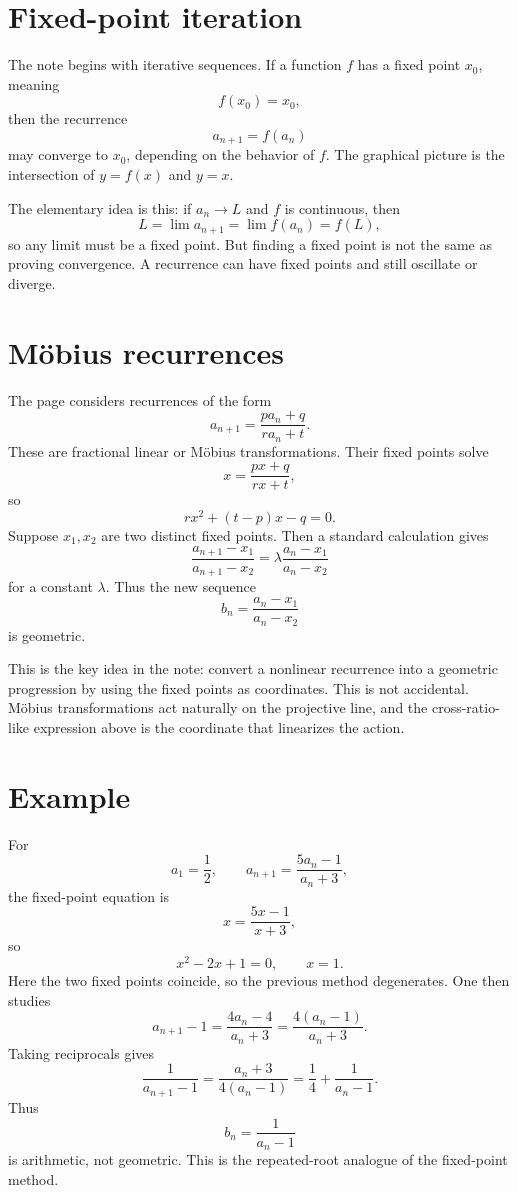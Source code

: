 
\section{Fixed-point iteration}

The note begins with iterative sequences.  If a function \(f\) has a fixed point \(x_0\), meaning
\[
  f(x_0)=x_0,
\]
then the recurrence
\[
  a_{n+1}=f(a_n)
\]
may converge to \(x_0\), depending on the behavior of \(f\).  The graphical picture is the intersection of \(y=f(x)\) and \(y=x\).

The elementary idea is this: if \(a_n\to L\) and \(f\) is continuous, then
\[
  L=\lim a_{n+1}=\lim f(a_n)=f(L),
\]
so any limit must be a fixed point.  But finding a fixed point is not the same as proving convergence.  A recurrence can have fixed points and still oscillate or diverge.

\section{Möbius recurrences}

The page considers recurrences of the form
\[
  a_{n+1}=\frac{pa_n+q}{ra_n+t}.
\]
These are fractional linear or Möbius transformations.  Their fixed points solve
\[
  x=\frac{px+q}{rx+t},
\]
so
\[
  rx^2+(t-p)x-q=0.
\]
Suppose \(x_1,x_2\) are two distinct fixed points.  Then a standard calculation gives
\[
  \frac{a_{n+1}-x_1}{a_{n+1}-x_2}
  =
  \lambda\frac{a_n-x_1}{a_n-x_2}
\]
for a constant \(\lambda\).  Thus the new sequence
\[
  b_n=\frac{a_n-x_1}{a_n-x_2}
\]
is geometric.

This is the key idea in the note: convert a nonlinear recurrence into a geometric progression by using the fixed points as coordinates.  This is not accidental.  Möbius transformations act naturally on the projective line, and the cross-ratio-like expression above is the coordinate that linearizes the action.

\section{Example}

For
\[
  a_1=\frac12,\qquad a_{n+1}=\frac{5a_n-1}{a_n+3},
\]
the fixed-point equation is
\[
  x=\frac{5x-1}{x+3},
\]
so
\[
  x^2-2x+1=0,\qquad x=1.
\]
Here the two fixed points coincide, so the previous method degenerates.  One then studies
\[
  a_{n+1}-1=\frac{4a_n-4}{a_n+3}=\frac{4(a_n-1)}{a_n+3}.
\]
Taking reciprocals gives
\[
  \frac1{a_{n+1}-1}=\frac{a_n+3}{4(a_n-1)}
  =\frac14+\frac1{a_n-1}.
\]
Thus
\[
  b_n=\frac1{a_n-1}
\]
is arithmetic, not geometric.  This is the repeated-root analogue of the fixed-point method.

